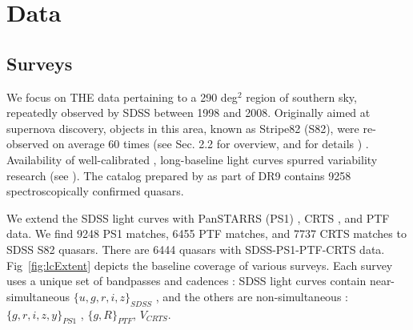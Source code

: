 \documentclass[twocolumn]{aastex62}
\begin{document}
%
%
%
%
%

\section{Data}\label{sec:data}
\subsection{Surveys}
We focus on THE data pertaining to a 290 deg$^{2}$ region of southern sky, repeatedly observed by SDSS between 1998 and 2008. Originally aimed at supernova discovery, objects in this area, known as Stripe82 (S82), were  re-observed on average 60 times (see \citealt{macleod2012} Sec. 2.2 for overview, and \citealt{annis2014} for details ) . Availability of well-calibrated \citep{ivezic2007}, long-baseline light curves  spurred variability research (see \citealt{sesar2007}). The catalog prepared by \citep{schneider2008} as part of DR9  contains 9258 spectroscopically confirmed quasars.  


\begin{figure*}
\caption{An illustration of survey baseline, sky area covered, and depth. The width of each rectangle corresponds to the extent of light curves available (or simulated) for Stripe 82 quasars for each survey. For SDSS this means DR7; for CRTS DR2, PS1 DR2, PTF DR2, ZTF year 2018, and LSST the full 10-year survey. The lower edge of each rectangle corresponds to the $5\sigma$ limiting magnitude (SDSS r, PS1 r, PTF R, ZTF r, LSST r, CRTS V). The vertical extent corresponds to the total survey area (for SDSS, up to and including DR15).  Note how PS1 and PTF extend the baseline of SDSS by approximately $50\%$, and how inclusion of LSST triples the SDSS baseline. For reference, the area covered by LSST is $25 000$ sq.deg., which corresponds to  $60\%$ of the sky. The whole sky has an area of $4\pi$ steradians (41253 sq.deg.).}
\label{fig:lcExtent}
\end{figure*} 


We extend the SDSS  light curves with PanSTARRS (PS1) \citep{chambers2011,flewelling2018}, CRTS \citep{drake2009}, and PTF \citep{rau2009} data. We find 9248 PS1 matches, 6455 PTF matches, and 7737 CRTS matches to SDSS S82 quasars. There are  6444 quasars with SDSS-PS1-PTF-CRTS data.  Fig~\ref{fig:lcExtent}  depicts the  baseline coverage of various surveys.  Each survey uses a unique set of bandpasses and cadences : SDSS light curves contain near-simultaneous $\{u,g,r,i,z\}_{SDSS}$ , and the others are  non-simultaneous : $\{g,r,i,z,y\}_{PS1}$ ,  $\{g,R\}_{PTF}$, $V_{CRTS}$.  
\end{document}
